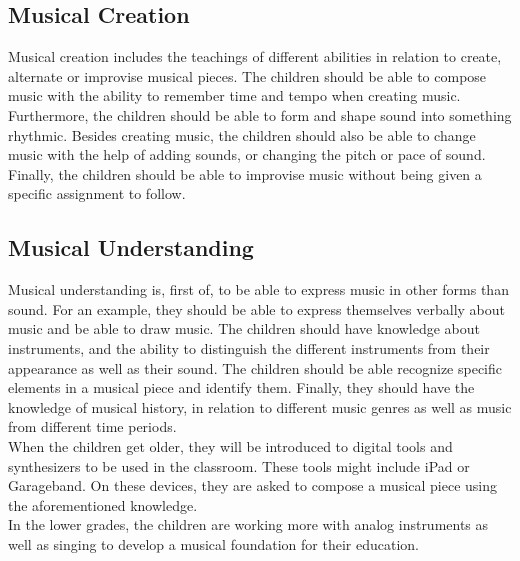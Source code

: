 	\subsection*{Musical Creation}
	Musical creation includes the teachings of different abilities in relation to create, alternate or improvise musical pieces. The children should be able to compose music with the ability to remember time and tempo when creating music. Furthermore, the children should be able to form and shape sound into something rhythmic. Besides creating music, the children should also be able to change music with the help of adding sounds, or changing the pitch or pace of sound. Finally, the children should be able to improvise music without being given a specific assignment to follow.
	
	\subsection*{Musical Understanding}
	Musical understanding is, first of, to be able to express music in other forms than sound. For an example, they should be able to express themselves verbally about music and be able to draw music. The children should have knowledge about instruments, and the ability to distinguish the different instruments from their appearance as well as their sound. The children should be able recognize specific elements in a musical piece and identify them. Finally, they should have the knowledge of musical history, in relation to different music genres as well as music from different time periods.
	\\
	
	When the children get older, they will be introduced to digital tools and synthesizers to be used in the classroom. These tools might include iPad or Garageband. On these devices, they are asked to compose a musical piece using the aforementioned knowledge.\\
	In the lower grades, the children are working more with analog instruments as well as singing to develop a musical foundation for their education.
	\\
